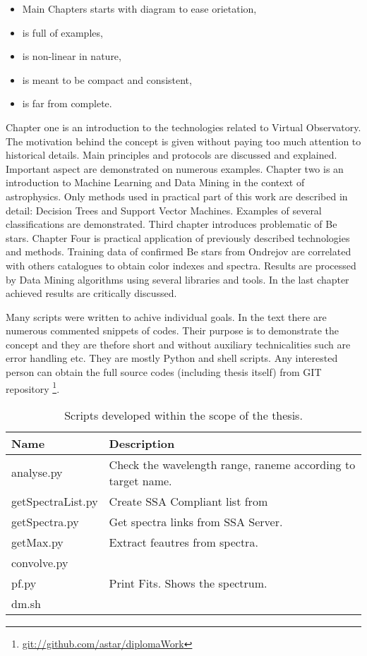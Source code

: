 \begin{itemize}
\item Main Chapters starts with diagram to ease orietation,
\item is full of examples, 
\item is non-linear in nature,
\item is meant to be compact and consistent,
\item is far from complete.
\end{itemize}

Chapter one is an introduction to the technologies related to Virtual
Observatory. The motivation behind the concept is given without paying
too much attention to historical details. Main principles and
protocols are discussed and explained. Important aspect are
demonstrated on numerous examples. Chapter two is an introduction to
Machine Learning and Data Mining in the context of astrophysics. Only
methods used in practical part of this work are described in detail:
Decision Trees and Support Vector Machines. Examples of several
classifications are demonstrated. Third chapter introduces problematic
of Be stars. Chapter Four is practical application of previously
described technologies and methods. Training data of confirmed Be
stars from Ondrejov are correlated with others catalogues to obtain
color indexes and spectra. Results are processed by Data Mining
algorithms using several libraries and tools. In the last chapter
achieved results are critically discussed. 

Many scripts were written to achive individual goals. In the text
there are numerous commented snippets of codes. Their purpose is to
demonstrate the concept and they are thefore short and without
auxiliary technicalities such are error handling etc. They are mostly
Python and shell scripts. Any interested person can obtain the full
source codes (including thesis itself) from GIT repository
\footnote{\url{git://github.com/astar/diplomaWork}}.


\begin{table}[ht]
  \centering
  \small
     \begin{tabular}[ht]{l l}
     \toprule
     Name & Description \\
     \midrule
     analyse.py & Check the wavelength range, raneme according to
     target name.\\
     getSpectraList.py & Create SSA Compliant list from\\
     getSpectra.py & Get spectra links from SSA Server.\\
     getMax.py & Extract feautres from spectra. \\
     convolve.py &  \\
     pf.py & Print Fits. Shows the spectrum. \\
     dm.sh &  \\ 
     \bottomrule
   \end{tabular}
  \caption{Scripts developed within the scope of the thesis.}
  \label{tab:scripts}
\end{table}






